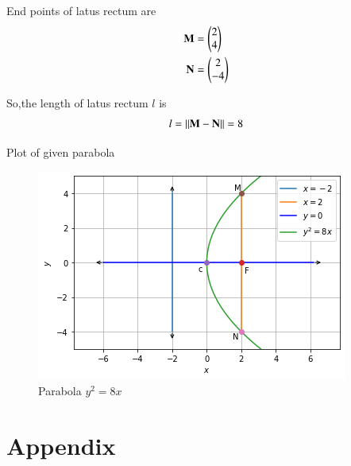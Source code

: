 \documentclass[journal,12pt,twocolumn]{IEEEtran}
\begin{document}
End points of latus rectum are
\begin{align}
\mathbf{M} &= \begin{pmatrix}2\\4\end{pmatrix}
\\
\mathbf{N} &= \begin{pmatrix}2\\-4\end{pmatrix}
\end{align}

So,the length of latus rectum $l$ is 
\begin{align}
l = \left\lVert\mathbf{M}-\mathbf{N}\right\rVert = 8
\end{align}

Plot of given parabola

\begin{figure}[!ht]
\centering
\includegraphics[width=\columnwidth]{Figure6}
\caption{Parabola $y^2=8x$ }
\label{fig:parabola}	
\end{figure}

\section{Appendix}
\end{document}
